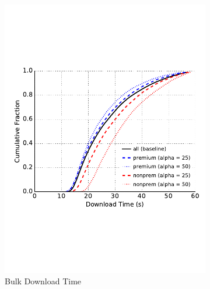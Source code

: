 \begin{figure}
\begin{subfigure}[t]{0.32\textwidth}
\includegraphics[trim={0 3cm 0 3cm}, clip, width=1.0\textwidth]{images/modifier_pr50_bulk.pdf}
		\caption{Bulk Download Time}
\label{fig:modifier_pr50_bulk}
	\end{subfigure}
	\begin{subfigure}[t]{0.32\textwidth} \centering

\end{subfigure}
\end{figure}
